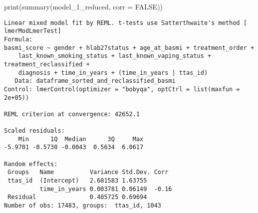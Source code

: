 \documentclass[
  letterpaper,
  DIV=11,
  numbers=noendperiod]{scrartcl}
\newenvironment{Shaded}{\begin{snugshade}}{\end{snugshade}}
\newcommand{\AttributeTok}[1]{\textcolor[rgb]{0.40,0.45,0.13}{#1}}
\newcommand{\ConstantTok}[1]{\textcolor[rgb]{0.56,0.35,0.01}{#1}}
\newcommand{\FunctionTok}[1]{\textcolor[rgb]{0.28,0.35,0.67}{#1}}
\newcommand{\NormalTok}[1]{\textcolor[rgb]{0.00,0.23,0.31}{#1}}
\begin{document}
\begin{Shaded}
\begin{Highlighting}[]
\FunctionTok{print}\NormalTok{(}\FunctionTok{summary}\NormalTok{(model\_1\_reduced, }\AttributeTok{corr =} \ConstantTok{FALSE}\NormalTok{))}
\end{Highlighting}
\end{Shaded}

\begin{verbatim}
Linear mixed model fit by REML. t-tests use Satterthwaite's method [
lmerModLmerTest]
Formula: 
basmi_score ~ gender + hlab27status + age_at_basmi + treatment_order +  
    last_known_smoking_status + last_known_vaping_status + treatment_reclassified +  
    diagnosis + time_in_years + (time_in_years | ttas_id)
   Data: dataframe_sorted_and_reclassified_basmi
Control: lmerControl(optimizer = "bobyqa", optCtrl = list(maxfun = 2e+05))

REML criterion at convergence: 42652.1

Scaled residuals: 
    Min      1Q  Median      3Q     Max 
-5.9701 -0.5730 -0.0043  0.5634  6.0617 

Random effects:
 Groups   Name          Variance Std.Dev. Corr 
 ttas_id  (Intercept)   2.681583 1.63755       
          time_in_years 0.003781 0.06149  -0.16
 Residual               0.485725 0.69694       
Number of obs: 17483, groups:  ttas_id, 1043


\end{verbatim}
\end{document}
